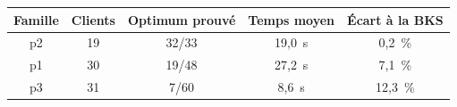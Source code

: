 \begin{tabular}{|c|c|c|c|c|}
\hline
\textbf{Famille} & \textbf{Clients} & \textbf{Optimum prouvé} & \textbf{Temps moyen} & \textbf{Écart à la BKS} \\
\hline
p2 & 19 & 32/33 & 19{,}0~s & 0{,}2~\% \\
\hline
p1 & 30 & 19/48 & 27{,}2~s & 7{,}1~\% \\
\hline
p3 & 31 & 7/60 & 8{,}6~s & 12{,}3~\% \\
\hline
\end{tabular}
